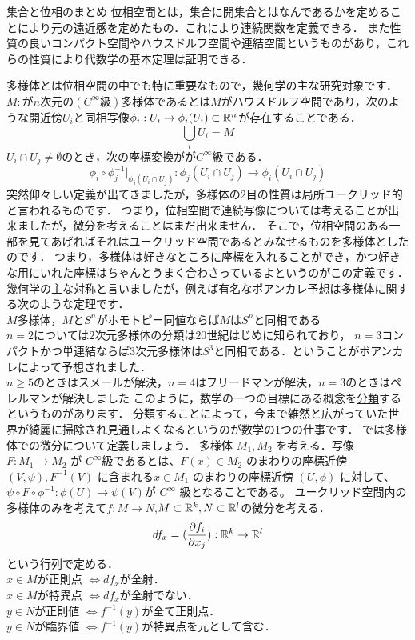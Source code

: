 \proofx
\begin{itembox}[l]{集合と位相のまとめ}
位相空間とは，集合に開集合とはなんであるかを定めることにより元の遠近感を定めたもの．これにより連続関数を定義できる．
また性質の良いコンパクト空間やハウスドルフ空間や連結空間というものがあり，これらの性質により代数学の基本定理は証明できる．
\end{itembox}
多様体とは位相空間の中でも特に重要なもので，幾何学の主な研究対象です．
$M:$が$n$次元の$(C^\infty 級)$多様体であるとは$M$がハウスドルフ空間であり，次のような開近傍$U_i$と同相写像$\phi_i : U_i \to \phi_i(U_i) \subset \mathbb R^n$が存在することである．\\
\[ \bigcup_i U_i = M \]
$U_i \cap U_j \neq \emptyset$のとき，次の座標変換がが$C^\infty$級である．
\[
\phi_i \circ \phi_j^{-1} | _{\phi_j(U_i\cap U_j)} :\phi_j(U_i\cap U_j) \to \phi_i(U_i\cap U_j)
\]
突然仰々しい定義が出てきましたが，多様体の$2$目の性質は局所ユークリッド的と言われるものです．
つまり，位相空間で連続写像については考えることが出来ましたが，微分を考えることはまだ出来ません．
そこで，位相空間のある一部を見てあげればそれはユークリッド空間であるとみなせるものを多様体としたのです．
つまり，多様体は好きなところに座標を入れることができ，かつ好きな用にいれた座標はちゃんとうまく合わさっているよというのがこの定義です．
幾何学の主な対称と言いましたが，例えば有名なポアンカレ予想は多様体に関する次のような定理です．
\thm[ポアンカレ予想]
\leavevmode\\
$M$多様体，$M$と$S^n$がホモトピー同値ならば$M$は$S^n$と同相である\\
$n=2$については$2$次元多様体の分類は$20$世紀はじめに知られており，
$n=3$コンパクトかつ単連結ならば$3$次元多様体は$S^3$と同相である．ということがポアンカレによって予想されました．\\
$n\ge 5$のときはスメールが解決，$n = 4$はフリードマンが解決，$n=3$のときはペレルマンが解決しました
\thmx
このように，数学の一つの目標にある概念を\underline{分類}するというものがあります．
分類することによって，今まで雑然と広がっていた世界が綺麗に掃除され見通しよくなるというのが数学の$1$つの仕事です．
では多様体での微分について定義しましょう．
多様体 $M_1, M_2$ を考える．写像 $F : M_1 \to M_2$ が $C^\infty$級であるとは、$F(x) \in M_2$ のまわりの座標近傍 $(V,\psi), F^{-1}(V)$ に含まれる$x\in M_1$ のまわりの座標近傍 $(U, \phi)$ に対して、
$\psi \circ F \circ \phi^{-1} : \phi(U) \to \psi(V )$が $C^\infty$ 級となることである。
ユークリッド空間内の多様体のみを考えて$f:M\to N$,$M\subset\mathbb R^k,N\subset\mathbb R^l$の微分を考える．\\
\[
df_x = (\frac{\partial f_i}{\partial x_j}):\mathbb R^k\to\mathbb R^l
\]
という行列で定める．\\
$x\in M$が正則点 $\iff df_x$が全射．\\
$x\in M$が特異点 $\iff df_x$が全射でない．\\
$y\in N$が正則値 $\iff f^{-1}(y)$が全て正則点．\\
$y\in N$が臨界値 $\iff f^{-1}(y)$が特異点を元として含む．\\

